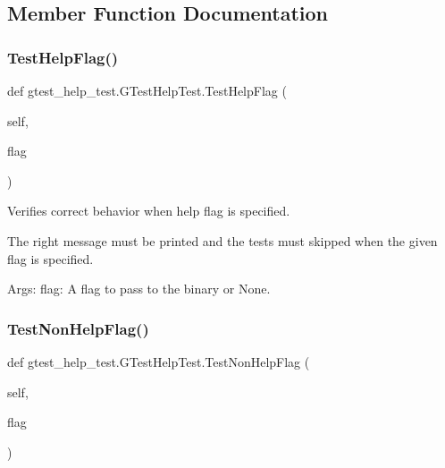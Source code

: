 \subsection{Member Function Documentation}
\mbox{\label{classgtest__help__test_1_1_g_test_help_test_a26cc1a64bd67278252ebfcd0ac0dca0c}} 
\subsubsection{\texorpdfstring{Test\+Help\+Flag()}{TestHelpFlag()}}
{\footnotesize\ttfamily def gtest\+\_\+help\+\_\+test.\+G\+Test\+Help\+Test.\+Test\+Help\+Flag (\begin{DoxyParamCaption}\item[{}]{self,  }\item[{}]{flag }\end{DoxyParamCaption})}

\begin{DoxyVerb}Verifies correct behavior when help flag is specified.

The right message must be printed and the tests must
skipped when the given flag is specified.

Args:
  flag:  A flag to pass to the binary or None.
\end{DoxyVerb}
 \mbox{\label{classgtest__help__test_1_1_g_test_help_test_a03ffa91ecf6193ed2ed80b53933112ab}} 
\subsubsection{\texorpdfstring{Test\+Non\+Help\+Flag()}{TestNonHelpFlag()}}
{\footnotesize\ttfamily def gtest\+\_\+help\+\_\+test.\+G\+Test\+Help\+Test.\+Test\+Non\+Help\+Flag (\begin{DoxyParamCaption}\item[{}]{self,  }\item[{}]{flag }\end{DoxyParamCaption})}


